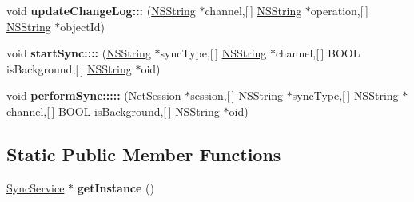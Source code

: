 \begin{DoxyCompactItemize}
\item 
\hypertarget{interface_sync_service_add4957596a4168c39fcc68b3fe4eb71e}{
void {\bfseries update\-Change\-Log\-:::} (\hyperlink{class_n_s_string}{\-N\-S\-String} $\ast$channel,\mbox{[}$\,$\mbox{]} \hyperlink{class_n_s_string}{\-N\-S\-String} $\ast$operation,\mbox{[}$\,$\mbox{]} \hyperlink{class_n_s_string}{\-N\-S\-String} $\ast$object\-Id)}
\label{interface_sync_service_add4957596a4168c39fcc68b3fe4eb71e}

\item 
\hypertarget{interface_sync_service_a40d8e1ec9d776105bbcd2287c04ef381}{
void {\bfseries start\-Sync\-::::} (\hyperlink{class_n_s_string}{\-N\-S\-String} $\ast$sync\-Type,\mbox{[}$\,$\mbox{]} \hyperlink{class_n_s_string}{\-N\-S\-String} $\ast$channel,\mbox{[}$\,$\mbox{]} \-B\-O\-O\-L is\-Background,\mbox{[}$\,$\mbox{]} \hyperlink{class_n_s_string}{\-N\-S\-String} $\ast$oid)}
\label{interface_sync_service_a40d8e1ec9d776105bbcd2287c04ef381}

\item 
\hypertarget{interface_sync_service_ae984191c3468f7007e27258a4146b488}{
void {\bfseries perform\-Sync\-:::::} (\hyperlink{interface_net_session}{\-Net\-Session} $\ast$session,\mbox{[}$\,$\mbox{]} \hyperlink{class_n_s_string}{\-N\-S\-String} $\ast$sync\-Type,\mbox{[}$\,$\mbox{]} \hyperlink{class_n_s_string}{\-N\-S\-String} $\ast$channel,\mbox{[}$\,$\mbox{]} \-B\-O\-O\-L is\-Background,\mbox{[}$\,$\mbox{]} \hyperlink{class_n_s_string}{\-N\-S\-String} $\ast$oid)}
\label{interface_sync_service_ae984191c3468f7007e27258a4146b488}

\end{DoxyCompactItemize}
\subsection*{\-Static \-Public \-Member \-Functions}
\begin{DoxyCompactItemize}
\item 
\hypertarget{interface_sync_service_a7bad0b15f1fe729e341e332046f6ff3d}{
\hyperlink{interface_sync_service}{\-Sync\-Service} $\ast$ {\bfseries get\-Instance} ()}
\label{interface_sync_service_a7bad0b15f1fe729e341e332046f6ff3d}

\end{DoxyCompactItemize}


